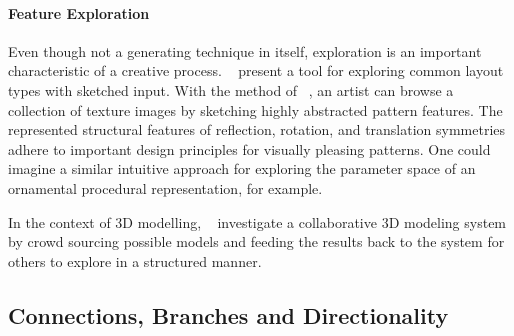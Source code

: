 \paragraph*{Feature Exploration}
\label{para:analysis_rulebased_exploration}

Even though not a generating technique in itself, exploration is an important characteristic of a creative process. \citeauthor*{todi_2016_sse}~\cite{todi_2016_sse} present a tool for exploring common layout types with sketched input. With the method of \citeauthor*{chen_2016_msi}~\cite{chen_2016_msi}, an artist can browse a collection of texture images by sketching highly abstracted pattern features. The represented structural features of reflection, rotation, and translation symmetries adhere to important design principles for visually pleasing patterns. One could imagine a similar intuitive approach for exploring the parameter space of an ornamental procedural representation, for example.

In the context of 3D modelling, \citeauthor*{talton_2009_emw}~\cite{talton_2009_emw} investigate a collaborative 3D modeling system by crowd sourcing possible models and feeding the results back to the system for others to explore in a structured manner. 

\subsection{Connections, Branches and Directionality}
\label{subsec:analysis_connections_branches_and_directionality}

  

